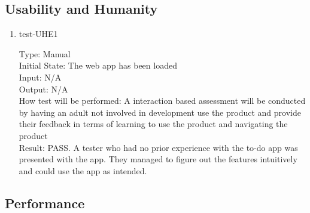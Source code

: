 \documentclass[12pt, titlepage]{article}
\begin{document}
\subsection{Usability and Humanity}

\begin{enumerate}

\item{test-UHE1\\}

Type: Manual\\
Initial State: The web app has been loaded\\
Input: N/A\\
Output: N/A\\
How test will be performed: A interaction based assessment will be conducted by having an adult not involved in development use the product and provide their feedback in terms of learning to use the product and navigating the product\\
Result: PASS. A tester who had no prior experience with the to-do app was presented with the app. They managed to figure out the features intuitively and could use the app as intended. 

\end{enumerate}

\subsection{Performance}
\end{document}

